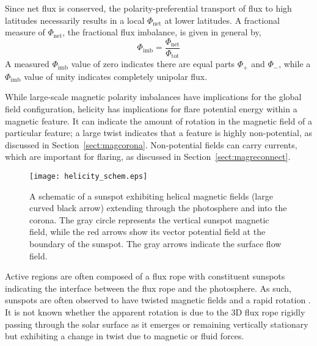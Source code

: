 Since net flux is conserved, the polarity-preferential transport of flux to high latitudes necessarily results in a local $\Phi_{\mathrm{net}}$ at lower latitudes. A fractional measure of $\Phi_{\mathrm{net}}$, the fractional flux imbalance, is given in general by,
\begin{equation}
\Phi_{\mathrm{imb}} = \frac{\Phi_{\mathrm{net}}}{\Phi_{\mathrm{tot}}}  
\end{equation}
A measured $\Phi_{\mathrm{imb}}$ value of zero indicates there are equal parts $\Phi_{+}$ and $\Phi_{-}$, while a $\Phi_{\mathrm{imb}}$ value of unity indicates completely unipolar flux. %

While large-scale magnetic polarity imbalances have implications for the global field configuration, helicity has implications for flare potential energy within a magnetic feature. It can indicate the amount of rotation in the magnetic field of a particular feature; a large twist indicates that a feature is highly non-potential, as discussed in Section~\ref{sect:magcorona}. Non-potential fields can carry currents, which are important for flaring, as discussed in Section~\ref{sect:magreconnect}. 

\begin{figure}[!t]
\centerline{\texttt{[image: helicity\_schem.eps]}}
\caption[A schematic of helicity within a sunspot.]{A schematic of a sunspot exhibiting helical magnetic fields (large curved black arrow) extending through the photosphere and into the corona. The gray circle represents the vertical sunspot magnetic field, while the red arrows show its vector potential field at the boundary of the sunspot.  The gray arrows indicate the surface flow field.}
\label{fig:helicity_schem}
\end{figure}

Active regions are often composed of a flux rope with constituent sunspots indicating the interface between the flux rope and the photosphere. As such, sunspots are often observed to have twisted magnetic fields and a rapid rotation \citep[up to $200^\circ$ in 3\,--\,5 days;][]{Brown:2003}. It is not known whether the apparent rotation is due to the 3D flux rope rigidly passing through the solar surface as it emerges or remaining vertically stationary but exhibiting a change in twist due to magnetic or fluid forces. 

